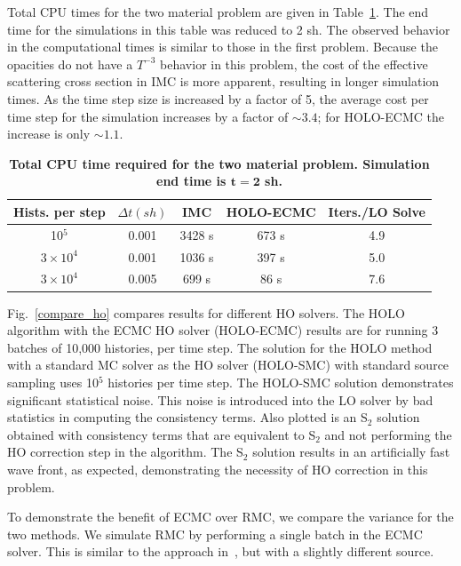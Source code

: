\documentclass{mc2013}
\begin{document}
Total CPU times for the two material problem are given in Table~\ref{twomat_table}. The end time for the simulations in this table was reduced to 2 sh.  The observed behavior in the computational times is similar to those
in the first problem.  Because the opacities do not have a $T^{-3}$ behavior in this problem, the cost of the effective scattering cross section in IMC is more apparent, resulting in longer simulation times.  As the time step size is increased by a factor of 5, the average cost per time step for the simulation increases by a factor of $\sim3.4$; for HOLO-ECMC the increase is only $\sim1.1$.   
\begin{table}[htb!]
\centering
\caption{\label{twomat_table} \textbf{Total CPU time required for the two material problem.  Simulation end time is $\mathbf{t=2}$ sh.}}
	\begin{tabular}{|cc|c|cc|} \hline
Hists. per step & $\Delta t (sh)$ & IMC & HOLO-ECMC  &  Iters./LO Solve\\ \hline
10$^5$                    &   0.001	& 3428 s  &	673 s & 4.9 \\
$3\times10^4 $   &    0.001	& 1036 s  &	397 s  &    5.0 \\
$3\times10^4$     &   0.005	&  699 s  &  86 s  &    7.6 \\ \hline
\end{tabular}
\end{table}



Fig.~\ref{compare_ho} compares results for different HO solvers.  The HOLO algorithm
with the ECMC HO solver (HOLO-ECMC) results
are for running 3 batches of 10,000 histories, per time step. The solution for the HOLO method with a standard MC solver as the HO solver
(HOLO-SMC) with standard source sampling uses 10$^5$ histories per time step. The HOLO-SMC solution demonstrates significant
statistical noise.  This noise is introduced into the LO solver by bad statistics in
computing the consistency terms. Also
plotted is an S$_2$ solution obtained with consistency terms that are equivalent
to S$_2$ and not performing the HO correction step in the algorithm.  The S$_2$ solution results in an artificially fast
wave front, as expected, demonstrating the necessity of HO correction in this problem.

To demonstrate the benefit of ECMC over RMC, we compare the variance for the two
methods. We simulate RMC by performing a single batch in the ECMC solver.  This is
similar to the approach in~\cite{rmc}, but with a slightly different source.
\end{document}
